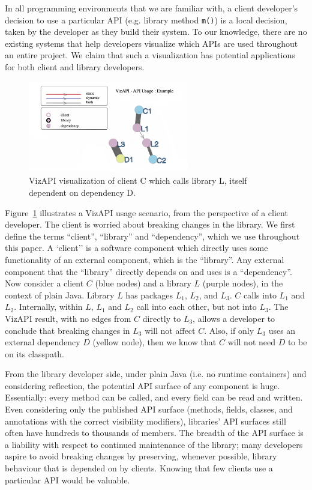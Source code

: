In all programming environments that we are familiar with, a client developer's decision to use a particular API (e.g. library method {\tt m()}) is a local decision, taken by the developer as they build their system. To our knowledge, there are no existing systems that help developers visualize which APIs are used throughout an entire project. We claim that such a visualization has potential applications for both client and library developers.
\begin{figure}[h]
\begin{center}
\includegraphics[height=4cm,width=7cm]{images/intro-example.png}
\caption{VizAPI visualization of client C which calls library L, itself dependent on dependency D.}
\label{fig:example}
\end{center}
\end{figure}


Figure~\ref{fig:example} illustrates a VizAPI usage scenario, from the perspective of a client developer. The client is worried about breaking changes in the library. We first define the terms ``client'', ``library'' and ``dependency'', which we use throughout this paper. A `client'' is a software component which directly uses some functionality of an external component, which is the ``library''. Any external component that the ``library'' directly depends on and uses is a ``dependency''. Now consider a client $C$ (blue nodes) and a library $L$ (purple nodes), in the context of plain Java. Library $L$ has packages $L_1$, $L_2$, and $L_3$. $C$ calls into $L_1$ and $L_2$. Internally, within $L$, $L_1$ and $L_2$ call into each other, but not into $L_3$. The VizAPI result, with no edges from $C$ directly to $L_3$, allows a developer to conclude that breaking changes in $L_3$ will not affect $C$. Also, if only $L_3$ uses an external dependency $D$ (yellow node), then we know that $C$ will not need $D$ to be on its classpath.

From the library developer side, under plain Java (i.e. no runtime containers) and considering reflection, the potential API surface of any component is huge. Essentially: every method can be called, and every field can be read and written. Even considering only the published API surface (methods, fields, classes, and annotations with the correct visibility modifiers), libraries' API surfaces still often have hundreds to thousands of members. The breadth of the API surface is a liability with respect to continued maintenance of the library; many developers aspire to avoid breaking changes by preserving, whenever possible, library behaviour that is depended on by clients. Knowing that few clients use a particular API would be valuable.

